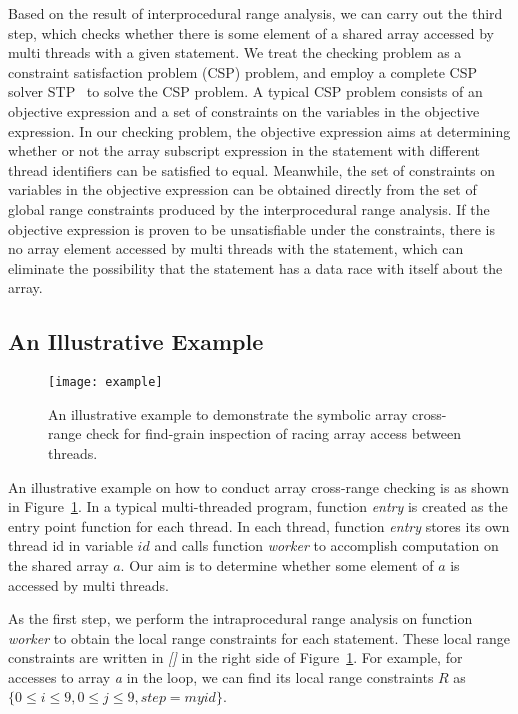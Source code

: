 \documentclass[10pt,onecolumn,letterpaper]{article}
\begin{document}
Based on the result of interprocedural range analysis, we can carry
out the third step, which checks whether there is some element of a
shared array accessed by multi threads with a given statement. We
treat the checking problem as a constraint satisfaction problem
(CSP) problem, and employ a complete CSP solver
STP~\cite{Ganesh07CAV} to solve the CSP problem. A typical CSP
problem consists of an objective expression and a set of constraints
on the variables in the objective expression. In our checking
problem, the objective expression aims at determining whether or not
the array subscript expression in the statement with different
thread identifiers can be satisfied to equal. Meanwhile, the set of
constraints on variables in the objective expression can be obtained
directly from the set of global range constraints produced by the
interprocedural range analysis. If the objective expression is
proven to be unsatisfiable under the constraints, there is no array
element accessed by multi threads with the statement, which can
eliminate the possibility that the statement has a data race with
itself about the array.



\subsection{An Illustrative Example}
\begin{figure}[htbg]
\centering
\texttt{[image: example]}
\caption{An illustrative example to demonstrate the symbolic array
cross-range check for find-grain inspection of racing array access
between threads.}\label{fig:example}
\end{figure}


An illustrative example on how to conduct array cross-range checking
is as shown in Figure~\ref{fig:example}. In a typical multi-threaded
program, function \emph{entry} is created as the entry point
function for each thread. In each thread, function \emph{entry}
stores its own thread id in variable $id$ and calls function
\emph{worker} to accomplish computation on the shared array $a$. Our
aim is to determine whether some element of $a$ is accessed by multi
threads.

As the first step, we perform the intraprocedural range analysis on
function \emph{worker} to obtain the local range constraints for
each statement. These local range constraints are written in
\emph{[]} in the right side of Figure~\ref{fig:example}. For
example, for accesses to array \emph{a} in the loop, we can find its
local range constraints $R$ as $\{0 \le i \le 9,0 \le j \le
9,step=myid\}$.
\end{document}
